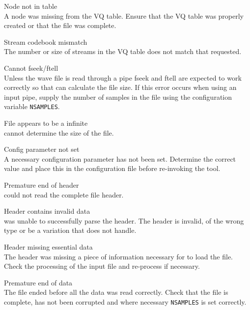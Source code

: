 \begin{itemize}
\begin{itemize}
    Node not in table\\
        A node was missing from the VQ table.  Ensure that the VQ table was 
        properly created or that the file was complete.

    Stream codebook mismatch\\
        The number or size of streams in the VQ table does not match that 
        requested.

\end{itemize}


\begin{itemize}
    Cannot fseek/ftell\\
        Unless the wave file is read through a pipe fseek and ftell are 
        expected to work correctly so that  can calculate the 
        file size.  If this error occurs when using an input pipe, supply 
        the number of samples in the file using the configuration variable
        \texttt{NSAMPLES}.

    File appears to be a infinite\\
         cannot determine the size of the file.

    Config parameter not set\\
        A necessary configuration parameter has not been set.  Determine the 
        correct value and place this in the configuration file before 
        re-invoking the tool.

    Premature end of header\\
         could not read the complete file header.

    Header contains invalid data\\
         was unable to successfully parse the header.  The header
        is invalid, of the wrong type or be a variation that  does
        not handle.

    Header missing essential data\\
        The header was missing a piece of information necessary for 
         to load the file.  Check the processing of the 
        input file and re-process if necessary.

    Premature end of data\\
        The file ended before all the data was read correctly.  Check that the
        file is complete, has not been corrupted and where necessary 
        \texttt{NSAMPLES} is set correctly.


\end{itemize}
\end{itemize}
